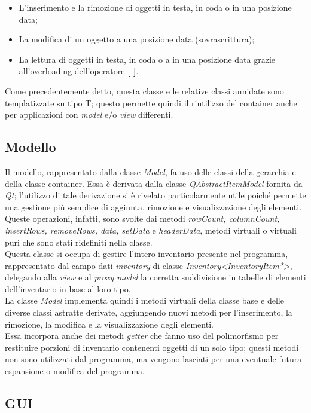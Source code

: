 \begin{itemize}
  \item L'inserimento e la rimozione di oggetti in testa, in coda o in una posizione data;
  \item La modifica di un oggetto a una posizione data (sovrascrittura);
  \item La lettura di oggetti in testa, in coda o a in una posizione data grazie all'overloading dell'operatore \textbf{[ ]}.
\end{itemize}
Come precedentemente detto, questa classe e le relative classi annidate sono templatizzate su tipo T; questo permette quindi il riutilizzo del container anche per applicazioni con \textit{model} e/o \textit{view} differenti.

\subsection{Modello}
Il modello, rappresentato dalla classe \textit{Model}, fa uso delle classi della gerarchia e della classe container. Essa è derivata dalla classe \textit{QAbstractItemModel} fornita da \textit{Qt}; l'utilizzo di tale derivazione si è rivelato particolarmente utile poiché permette una gestione più semplice di aggiunta, rimozione e visualizzazione degli elementi. Queste operazioni, infatti, sono svolte dai metodi \textit{rowCount, columnCount, insertRows, removeRows, data, setData} e \textit{headerData}, metodi virtuali o virtuali puri che sono stati ridefiniti nella classe. \\
Questa classe si occupa di gestire l'intero inventario presente nel programma, rappresentato dal campo dati \textit{inventory} di classe \textit{Inventory<InventoryItem*>}, delegando alla \textit{view} e al \textit{proxy model} la corretta suddivisione in tabelle di elementi dell'inventario in base al loro tipo. \\
La classe \textit{Model} implementa quindi i metodi virtuali della classe base e delle diverse classi astratte derivate, aggiungendo nuovi metodi per l'inserimento, la rimozione, la modifica e la visualizzazione degli elementi. \\
Essa incorpora anche dei metodi \textit{getter} che fanno uso del polimorfismo per restituire porzioni di inventario contenenti oggetti di un solo tipo; questi metodi non sono utilizzati dal programma, ma vengono lasciati per una eventuale futura espansione o modifica del programma.

\subsection{GUI}


